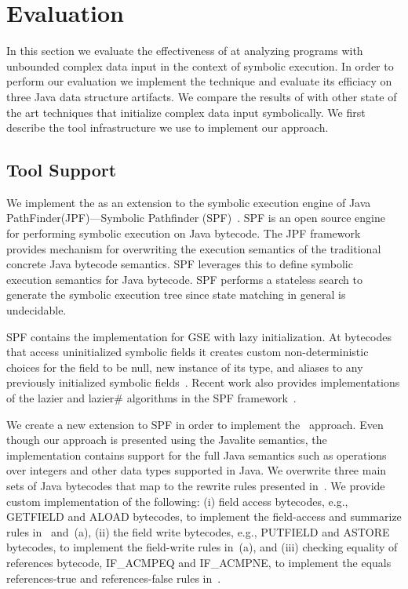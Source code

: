 

\section{Evaluation}

In this section we evaluate the effectiveness of \symtxt{} at
analyzing programs with unbounded complex data input in the context of
symbolic execution. In order to perform our evaluation we implement
the \symtxt{} technique and evaluate its efficiacy on three Java data
structure artifacts. We compare the results of \symtxt{} with other
state of the art techniques that initialize complex data input
symbolically. We first describe the tool infrastructure we use to
implement our approach.

\subsection{Tool Support}
We implement the \symtxt{} as an extension to the symbolic execution
engine of Java PathFinder(JPF)---Symbolic Pathfinder
(SPF)~\cite{visser:ase03,Pasareanu:ISSTA08,pasareanu:ase10}. SPF is an
open source engine for performing symbolic execution on Java
bytecode. The JPF framework provides mechanism for overwriting the
execution semantics of the traditional concrete Java bytecode
semantics. SPF leverages this to define symbolic execution semantics
for Java bytecode. SPF performs a stateless search to generate the
symbolic execution tree since state matching in general is
undecidable.  

SPF contains the implementation for GSE with lazy initialization. At
bytecodes that access uninitialized symbolic fields it creates custom
non-deterministic choices for the field to be null, new instance of
its type, and aliases to any previously initialized symbolic
fields~\cite{DBLP:journals/ase/PasareanuVBGMR13}. Recent work also
provides implementations of the lazier and lazier\# algorithms in the
SPF framework~\cite{Hillery:2014}.

We create a new extension to SPF in order to implement the~\symtxt{}
approach. Even though our approach is presented using the Javalite
semantics, the implementation contains support for the full Java
semantics such as operations over integers and other data types
supported in Java. We overwrite three main sets of Java bytecodes that
map to the rewrite rules presented in~. We provide
custom implementation of the following: (i) field access bytecodes,
e.g., GETFIELD and ALOAD bytecodes, to implement the field-access and
summarize rules in~ and~(a),
(ii) the field write bytecodes, e.g., PUTFIELD and ASTORE bytecodes,
to implement the field-write rules in~(a), and (iii)
checking equality of references bytecode, IF\_ACMPEQ and IF\_ACMPNE,
to implement the equals references-true and references-false rules
in~. 


